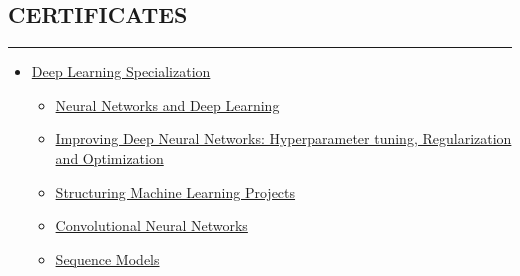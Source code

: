 \documentclass[10pt,a4]{article}
\begin{document}
\subsection*{CERTIFICATES}
\hrule  height 4pt
\vspace{0.2cm}
\begin{itemize}
  \item \href{https://www.coursera.org/account/accomplishments/specialization/9WCEB5PYL6VT}{Deep Learning Specialization}
  \begin{itemize}
    \item \href{https://www.coursera.org/account/accomplishments/verify/JSDREA8QF6XG}{Neural Networks and Deep Learning}
    \item \href{https://www.coursera.org/account/accomplishments/verify/8FCH622WF97A}{Improving Deep Neural Networks: Hyperparameter tuning, Regularization and Optimization}
    \item \href{https://www.coursera.org/account/accomplishments/verify/UXZBYZQKAEU9}{Structuring Machine Learning Projects}
    \item \href{https://www.coursera.org/account/accomplishments/verify/GNUR9KQXTNPS}{Convolutional Neural Networks}
    \item \href{https://www.coursera.org/account/accomplishments/verify/RE53JG7A9ZKV}{Sequence Models}
  \end{itemize}
\end{itemize}
\end{document}
